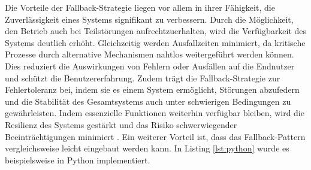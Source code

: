 Die Vorteile der Fallback-Strategie liegen vor allem in ihrer Fähigkeit, die Zuverlässigkeit eines Systems signifikant zu verbessern.
Durch die Möglichkeit, den Betrieb auch bei Teilstörungen aufrechtzuerhalten,
wird die Verfügbarkeit des Systems deutlich erhöht. Gleichzeitig werden Ausfallzeiten minimiert,
da kritische Prozesse durch alternative Mechanismen nahtlos weitergeführt werden können.
Dies reduziert die Auswirkungen von Fehlern oder Ausfällen auf die Endnutzer und schützt die Benutzererfahrung.
Zudem trägt die Fallback-Strategie zur Fehlertoleranz bei, indem sie es einem System ermöglicht, Störungen abzufedern
und die Stabilität des Gesamtsystems auch unter schwierigen Bedingungen zu gewährleisten.
Indem essenzielle Funktionen weiterhin verfügbar bleiben, wird die Resilienz des Systems gestärkt und das
Risiko schwerwiegender Beeinträchtigungen minimiert \cite{fallback-strategy-cons}.
Ein weiterer Vorteil ist, dass das Fallback-Pattern vergleichsweise leicht eingebaut werden kann. In Listing \ref{lst:python} wurde es beispielsweise in Python implementiert.